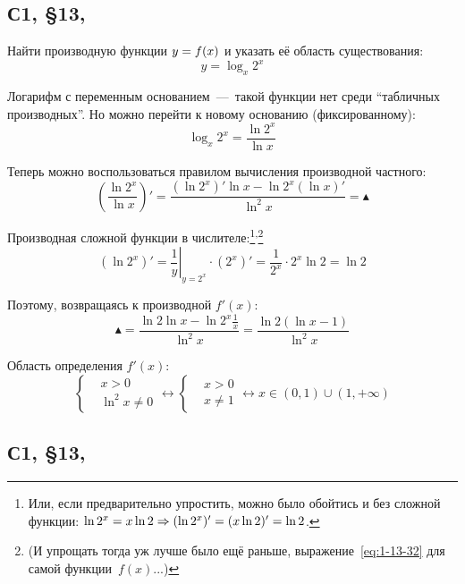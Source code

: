\documentclass[a4paper,12pt]{article}
\begin{document}
  
  \subsection{С1, \S 13, }
  
  Найти производную функции $y \hm= f(x)$ и указать её область существования:
  \[
    y = \log_x 2^x
  \]
  
  \begin{solution}
    Логарифм с переменным основанием~---~такой функции нет среди ``табличных производных''.
    Но можно перейти к новому основанию (фиксированному):
    \begin{equation}\label{eq:1-13-32}
      \log_x 2^x = \frac{\ln 2^x}{\ln x}
    \end{equation}
    
    Теперь можно воспользоваться правилом вычисления производной частного:
    \[
      \left(\frac{\ln 2^x}{\ln x}\right)' = \frac{(\ln 2^x)' \ln x - \ln 2^x (\ln x)'}{\ln^2 x} = \blacktriangle
    \]
    
    Производная сложной функции в числителе:\footnote{
      Или, если предварительно упростить, можно было обойтись и без сложной функции: $\ln 2^x \hm= x \ln 2 \Rightarrow (\ln 2^x)' \hm= (x \ln 2)' = \ln 2$.
    }\textsuperscript{,}\footnote{
      (И упрощать тогда уж лучше было ещё раньше, выражение~\eqref{eq:1-13-32} для самой функции~$f(x)$...)
    }  %
    \[
      (\ln 2^x)' = \left.\frac{1}{y}\right|_{y = 2^x} \cdot (2^x)' = \frac{1}{2^x} \cdot 2^x \ln 2 = \ln 2
    \]
    
    Поэтому, возвращаясь к производной $f'(x)$:
    \[
      \blacktriangle = \frac{\ln 2 \ln x - \ln 2^x \frac{1}{x}}{\ln^2 x} = \frac{\ln 2 (\ln x - 1)}{\ln^2 x}
    \]
    
    Область определения $f'(x)$:
    \[
      \left\{
        \begin{aligned}
          &x > 0\\
          &\ln^2 x \not= 0
        \end{aligned}
      \right. \leftrightarrow
      \left\{
        \begin{aligned}
          &x > 0\\
          &x \not= 1
        \end{aligned}
      \right. \leftrightarrow x \in (0, 1) \cup (1, +\infty)
    \]
  \end{solution}
  
  
  \subsection{С1, \S 13, }
  
\end{document}
